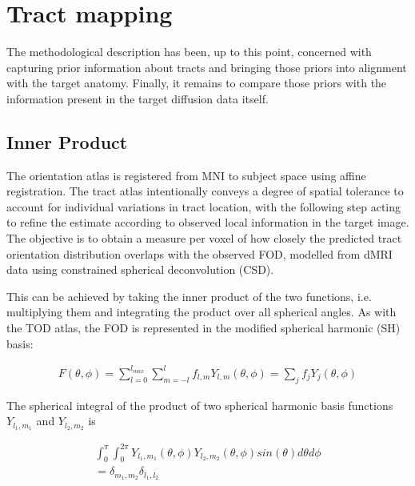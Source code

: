 \section{Tract mapping}
\label{chapterlabel4}


The methodological description has been, up to this point, concerned with capturing
prior information about tracts and bringing those priors into alignment with the target anatomy.
Finally, it remains to compare those priors with the information present in the target diffusion data itself.

\subsection{Inner Product}


The orientation atlas is registered from MNI to subject space using affine registration.
The tract atlas intentionally conveys a degree of spatial tolerance to account for individual variations in tract location, with the following step acting to refine the estimate according to observed local information in the target image.
The objective is to obtain a measure per voxel of how closely the predicted tract orientation distribution overlaps with the observed FOD, modelled from dMRI data using constrained spherical deconvolution (CSD). \autocite{Tournier2007}

This can be achieved by taking the inner product of the two functions, i.e. multiplying them and integrating the product over all spherical angles.
As with the TOD atlas, the FOD is represented in the modified spherical harmonic (SH) basis:

\begin{align}
  F(\theta, \phi) = \sum_{l=0}^{l_{max}} \sum_{m=-l}^l f_{l,m} Y_{l,m}(\theta, \phi) = \sum_j f_jY_j(\theta, \phi)
\end{align}


The spherical integral of the product of two spherical harmonic basis functions $Y_{l_1,m_1}$ and $Y_{l_2,m_2}$ is

\begin{align}
  \int_0^{\pi} \int_0^{2\pi} Y_{l_1,m_1}(\theta, \phi) Y_{l_2,m_2}(\theta, \phi) sin(\theta) d\theta d\phi \\
    = \delta_{m_1, m_2} \delta_{l_1, l_2}
\end{align}


